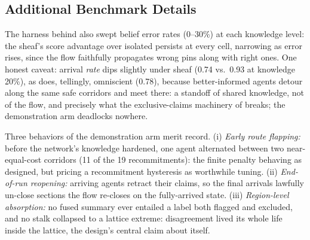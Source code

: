 \documentclass[10pt]{article}
\theoremstyle{definition}
\theoremstyle{remark}
\begin{document}
\subsection{Additional Benchmark Details}
\label{sec:app-benchmark}

The harness behind  also swept belief error rates (0--30\%) at each knowledge level: the sheaf's score advantage over \textsf{isolated} persists at every cell, narrowing as error rises, since the flow faithfully propagates wrong pins along with right ones. One honest caveat: arrival \emph{rate} dips slightly under \textsf{sheaf} (0.74 vs.\ 0.93 at knowledge 20\%), as does, tellingly, \textsf{omniscient} (0.78), because better-informed agents detour along the same safe corridors and meet there: a standoff of shared knowledge, not of the flow, and precisely what the exclusive-claims machinery of  breaks; the demonstration arm deadlocks nowhere.

\label{sec:app-behaviors}Three behaviors of the demonstration arm merit record. (i) \emph{Early route flapping:} before the network's knowledge hardened, one agent alternated between two near-equal-cost corridors (11 of the 19 recommitments): the finite penalty behaving as designed, but pricing a recommitment hysteresis as worthwhile tuning. (ii) \emph{End-of-run reopening:} arriving agents retract their claims, so the final arrivals lawfully un-close sections the flow re-closes on the fully-arrived state. (iii) \emph{Region-level absorption:} no fused summary ever entailed a label both flagged and excluded, and no stalk collapsed to a lattice extreme: disagreement lived its whole life inside the lattice, the design's central claim about itself.

\end{document}

